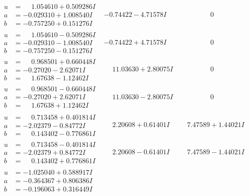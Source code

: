 \documentclass[1p]{elsarticle_modified}
\theoremstyle{definition}
\begin{document}
$$\begin{array}{c|c|c}
\begin{aligned}
u &= \phantom{-}1.054610 + 0.509286 I \\
a &= -0.029310 + 1.008540 I \\
b &= -0.757250 + 0.151276 I\end{aligned}
 & -0.74422 - 4.71578 I & \phantom{-0.000000 } 0 \\ \hline\begin{aligned}
u &= \phantom{-}1.054610 - 0.509286 I \\
a &= -0.029310 - 1.008540 I \\
b &= -0.757250 - 0.151276 I\end{aligned}
 & -0.74422 + 4.71578 I & \phantom{-0.000000 } 0 \\ \hline\begin{aligned}
u &= \phantom{-}0.968501 + 0.660448 I \\
a &= -0.27020 - 2.62071 I \\
b &= \phantom{-}1.67638 - 1.12462 I\end{aligned}
 & \phantom{-}11.03630 + 2.80075 I & \phantom{-0.000000 } 0 \\ \hline\begin{aligned}
u &= \phantom{-}0.968501 - 0.660448 I \\
a &= -0.27020 + 2.62071 I \\
b &= \phantom{-}1.67638 + 1.12462 I\end{aligned}
 & \phantom{-}11.03630 - 2.80075 I & \phantom{-0.000000 } 0 \\ \hline\begin{aligned}
u &= \phantom{-}0.713458 + 0.401814 I \\
a &= -2.02379 - 0.84772 I \\
b &= \phantom{-}0.143402 - 0.776861 I\end{aligned}
 & \phantom{-}2.20608 + 0.61401 I & \phantom{-}7.47589 + 1.44021 I \\ \hline\begin{aligned}
u &= \phantom{-}0.713458 - 0.401814 I \\
a &= -2.02379 + 0.84772 I \\
b &= \phantom{-}0.143402 + 0.776861 I\end{aligned}
 & \phantom{-}2.20608 - 0.61401 I & \phantom{-}7.47589 - 1.44021 I \\ \hline\begin{aligned}
u &= -1.025040 + 0.588917 I \\
a &= -0.364367 + 0.806386 I \\
b &= -0.196063 + 0.316449 I\end{aligned}

\end{array}$$
\end{document}
